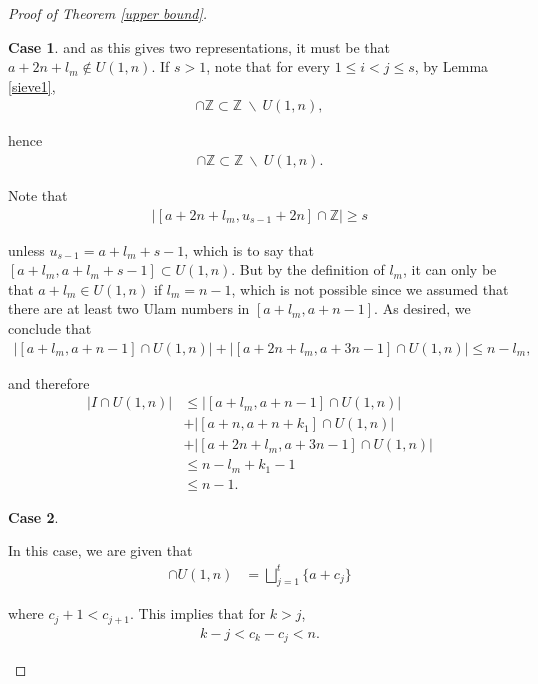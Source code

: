 \documentclass{amsart}
\newcommand{\ZZ}{\mathbb{Z}}
\theoremstyle{theorem}
\theoremstyle{definition}
\newtheorem{case}{Case}
\begin{document}
\begin{proof}[Proof of Theorem \ref{upper bound}]
\begin{case}
\noindent and as this gives two representations, it must be that $a + 2n + l_m \notin U(1,n)$. If $s > 1$, note that for every $1 \leq i < j \leq s$, by Lemma \ref{sieve1},
	\begin{align*}
    [u_j + n, u_i + 2n] \cap \ZZ \subset \ZZ \ \backslash \ U(1,n),
	\end{align*}
    
\noindent hence
	\begin{align*}
    [a + 2n + l_m, u_{s - 1} + 2n] \cap \ZZ \subset \ZZ \ \backslash \ U(1,n).
    \end{align*}
    
 \noindent Note that
 	\begin{align*}
    \left|[a + 2n + l_m, u_{s - 1} + 2n] \cap \ZZ\right| \geq s
	\end{align*}
 
\noindent unless $u_{s - 1} = a + l_m + s - 1$, which is to say that $[a + l_m, a + l_m + s - 1] \subset U(1,n)$. But by the definition of $l_m$, it can only be that $a + l_m \in U(1,n)$ if $l_m = n - 1$, which is not possible since we assumed that there are at least two Ulam numbers in $[a + l_m, a + n - 1]$. As desired, we conclude that
	\begin{align*}
    \left|[a + l_m, a + n - 1] \cap U(1,n)\right| + \left|[a + 2n + l_m, a+ 3n - 1] \cap U(1,n)\right|  \leq n - l_m,
    \end{align*}
    
\noindent and therefore
	\begin{align*}
    \left|I \cap U(1,n)\right| &\leq \left|[a + l_m, a + n - 1] \cap U(1,n)\right| \\
    &+ \left|[a + n, a + n + k_1] \cap U(1,n)\right| \\
    &+ \left|[a + 2n + l_m, a+ 3n - 1] \cap U(1,n)\right| \\
    &\leq n - l_m + k_1 - 1 \\
    &\leq n - 1.
    \end{align*}
\end{case}

\begin{case} \

In this case, we are given that 
	\begin{align*}
    [a, a+ n - 1] \cap U(1,n) &= \bigsqcup_{j = 1}^t \{a + c_j\}
    \end{align*}
    
\noindent where $c_j + 1 < c_{j + 1}$. This implies that for $k > j$,
	\begin{align*}
    k - j < c_k - c_j < n.
    \end{align*}
    

\end{case}
\end{proof}
\end{document}
